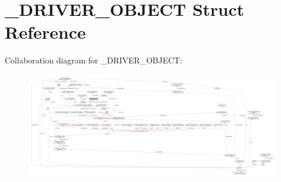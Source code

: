 \hypertarget{struct__DRIVER__OBJECT}{}\section{\+\_\+\+D\+R\+I\+V\+E\+R\+\_\+\+O\+B\+J\+E\+C\+T Struct Reference}
\label{struct__DRIVER__OBJECT}


Collaboration diagram for \+\_\+\+D\+R\+I\+V\+E\+R\+\_\+\+O\+B\+J\+E\+C\+T\+:
\nopagebreak
\begin{figure}[H]
\begin{center}
\leavevmode
\includegraphics[width=350pt]{struct__DRIVER__OBJECT__coll__graph}
\end{center}
\end{figure}
